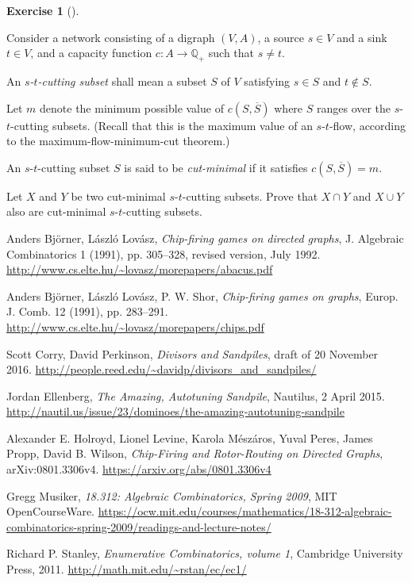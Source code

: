 \documentclass[numbers=enddot,12pt,final,onecolumn,notitlepage]{scrartcl}%
\newcounter{exer}
\theoremstyle{definition}
\newtheorem{exmp}[exer]{Exercise}
\newenvironment{exercise}[1][]
{\begin{exmp}[#1]\begin{leftbar}}
{\end{leftbar}\end{exmp}}
\newcommand{\QQ}{\mathbb{Q}}
\newcommand{\tup}[1]{\left( #1 \right)}
\begin{document}
\begin{exercise} \label{exe.flows-cuts.cut-lattice}
Consider a network consisting of a digraph
$\tup{V, A}$, a source $s \in V$ and a sink $t \in V$,
and a capacity function $c : A \to \QQ_+$
such that $s \neq t$.

An \textit{$s$-$t$-cutting subset} shall mean a subset
$S$ of $V$ satisfying $s \in S$ and $t \notin S$.

Let $m$ denote the minimum possible value of
$c \tup{S, \overline{S}}$ where $S$ ranges over the
$s$-$t$-cutting subsets.
(Recall that this is the maximum value of an
$s$-$t$-flow, according to the
maximum-flow-minimum-cut theorem.)

An $s$-$t$-cutting subset $S$ is said to be
\textit{cut-minimal} if it satisfies
$c \tup{S, \overline{S}} = m$.

Let $X$ and $Y$ be two cut-minimal $s$-$t$-cutting subsets.
Prove that $X \cap Y$ and $X \cup Y$ also are
cut-minimal $s$-$t$-cutting subsets.
\end{exercise}

\begin{thebibliography}{99999999}

Anders Bj\"orner, L\'aszl\'o Lov\'asz,
\textit{Chip-firing games on directed graphs},
J. Algebraic Combinatorics 1 (1991), pp. 305--328,
revised version, July 1992.
\newline\url{http://www.cs.elte.hu/~lovasz/morepapers/abacus.pdf}

Anders Bj\"orner, L\'aszl\'o Lov\'asz, P. W. Shor,
\textit{Chip-firing games on graphs},
Europ. J. Comb. 12 (1991), pp. 283--291.
\newline\url{http://www.cs.elte.hu/~lovasz/morepapers/chips.pdf}

Scott Corry, David Perkinson,
\textit{Divisors and Sandpiles},
draft of 20 November 2016.
\newline\url{http://people.reed.edu/~davidp/divisors_and_sandpiles/}

Jordan Ellenberg,
\textit{The Amazing, Autotuning Sandpile},
Nautilus, 2 April 2015.
\newline\url{http://nautil.us/issue/23/dominoes/the-amazing-autotuning-sandpile}

Alexander E. Holroyd, Lionel Levine, Karola M\'esz\'aros,
Yuval Peres, James Propp, David B. Wilson,
\textit{Chip-Firing and Rotor-Routing on Directed Graphs},
arXiv:0801.3306v4.
\newline\url{https://arxiv.org/abs/0801.3306v4}

Gregg Musiker,
\textit{18.312: Algebraic Combinatorics, Spring 2009},
MIT OpenCourseWare.
\newline\url{https://ocw.mit.edu/courses/mathematics/18-312-algebraic-combinatorics-spring-2009/readings-and-lecture-notes/}

Richard P. Stanley, \textit{Enumerative
Combinatorics, volume 1}, Cambridge University Press, 2011. \newline%
\url{http://math.mit.edu/~rstan/ec/ec1/}

\end{thebibliography}
\end{document}
